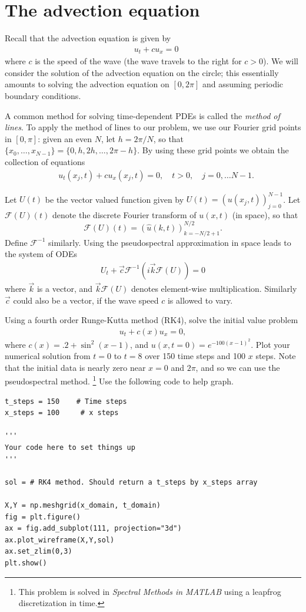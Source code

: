 \section*{The advection equation}
Recall that the advection equation is given by
\begin{align}
&{ }u_t + cu_x = 0
\end{align}
where $c$ is the speed of the wave (the wave travels to the right for $c > 0$).
We will consider the solution of the advection equation on the circle; this essentially amounts to solving the advection equation on $[0,2\pi]$ and assuming periodic boundary conditions. 

A common method for solving time-dependent PDEs is called the \textit{method of lines}.
To apply the method of lines to our problem, we use our Fourier grid points in $[0,\pi]$: given an even $N$, let $h = 2\pi/N$, so that $\{x_0,\ldots,x_{N-1}\} = \{0,h,2h,\ldots,2\pi-h\}$.
By using these grid points we obtain the collection of equations
\begin{align}
&{ }u_t(x_j,t) + cu_x(x_j,t) = 0, \quad t >0, \quad j = 0, \ldots N-1. \label{spectral2:method_oflines}
\end{align}

Let $U(t)$ be the vector valued function given by $U(t) = (u(x_j,t))_{j=0}^{N-1}$.
Let $\mathcal{F}(U)(t)$ denote the discrete Fourier transform of $u(x,t)$ (in space), so that 
\[
\mathcal{F}(U)(t) = (\hat{u}(k,t))_{k=-N/2+1}^{N/2}.
\]
Define $\mathcal{F}^{-1}$ similarly.
Using the pseudospectral approximation in space leads to the system of ODEs
\begin{align}
	U_t +  \vec{c}\mathcal{F}^{-1}\left(i\vec{k}\mathcal{F}(U) \right) = 0
\end{align}
where $\vec{k}$ is a vector, and $\vec{k}\mathcal{F}(U) $ denotes element-wise multiplication. 
Similarly $\vec{c}$ could also be a vector, if the wave speed $c$ is allowed to vary. 

\begin{problem}
	Using a fourth order Runge-Kutta method (RK4), solve the initial value problem 
	\begin{align}
		u_t +c(x) u_x = 0,
	\end{align}
where $c(x) = .2 + \sin^2(x-1)$, and $u(x,t=0) = e^{-100(x-1)^2}.$ 
Plot your numerical solution from $t = 0$ to $t = 8$ over 150 time steps and 100 $x$ steps. 
Note that the initial data is nearly zero near $x = 0$ and $2 \pi$, and so we can use the pseudospectral method.
\footnote{This problem is solved in \textit{Spectral Methods in MATLAB} using a leapfrog discretization in time. } 
\label{spectral2:advection_equation}
Use the following code to help graph.
\begin{lstlisting}
t_steps = 150    # Time steps
x_steps = 100     # x steps

'''
Your code here to set things up
'''

sol = # RK4 method. Should return a t_steps by x_steps array

X,Y = np.meshgrid(x_domain, t_domain)
fig = plt.figure()
ax = fig.add_subplot(111, projection="3d")
ax.plot_wireframe(X,Y,sol)
ax.set_zlim(0,3)
plt.show()
\end{lstlisting}
\end{problem}

